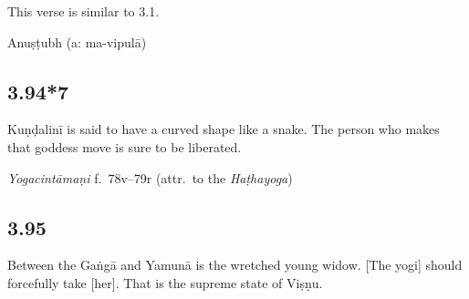 \begin{ekdosis}
\begin{philcomm}[hp03_094_6]
This verse is similar to 3.1.
\end{philcomm}

\begin{metre}[hp03_094_6]
Anuṣṭubh (a: ma-vipulā)
\end{metre}

\subsection*{3.94*7}
\begin{translation}[hp03_094_7]
Kuṇḍalinī is said to have a curved shape like a snake. The person who makes that goddess move is sure to be liberated.
\end{translation}


\begin{testimonia}[hp03_094_7]
\emph{Yogacintāmaṇi} f.~78v–79r (attr.~to the \emph{Haṭhayoga})
\begin{versinnote}
\end{versinnote}
\end{testimonia}



\subsection*{3.95}
\begin{translation}[hp03_095]
Between the Gaṅgā and Yamunā is the wretched young widow. [The yogi] should forcefully take [her]. That is the supreme state of Viṣṇu.
\end{translation}


\end{ekdosis}
